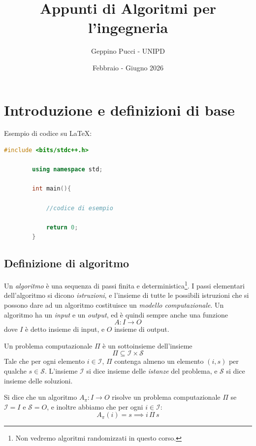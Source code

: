 \documentclass[11pt]{scrartcl}
\begin{document}
	\title{Appunti di Algoritmi per l'ingegneria}
	\subtitle{Geppino Pucci - UNIPD}
	\date{Febbraio - Giugno 2026}
	
	
	\maketitle
	
	\tableofcontents
	
	\newpage
	
	\section{Introduzione e definizioni di base}
	Esempio di codice su \LaTeX:
	\begin{lstlisting}[language=C++]
		#include <bits/stdc++.h>
		
		using namespace std;
		
		int main(){
			
			//codice di esempio
			
			return 0;
		}
	\end{lstlisting}
	
	\subsection{Definizione di algoritmo}
	
	\begin{definition}[Algoritmo]
		Un \textit{algoritmo} è una sequenza di passi finita e deterministica\footnote{Non vedremo algoritmi randomizzati in questo corso.}. I passi elementari dell'algoritmo si dicono \textit{istruzioni}, e l'insieme di tutte le possibili istruzioni che si possono dare ad un algoritmo costituisce un \textit{modello computazionale}. Un algoritmo ha un \textit{input} e un \textit{output}, ed è quindi sempre anche una funzione
		$$A:I\to O$$
		dove $I$ è detto insieme di input, e $O$ insieme di output.
	\end{definition}
	\begin{definition}
		Un problema computazionale $\Pi$ è un sottoinsieme dell'insieme 
		$$\Pi\subseteq \mathcal{I}\times \mathcal{S}$$
		Tale che per ogni elemento $i\in\mathcal{I}$, $\Pi$ contenga almeno un elemento $(i,s)$ per qualche $s\in\mathcal{S}$. L'insieme $\mathcal{I}$ si dice insieme delle \textit{istanze} del problema, e $\mathcal{S}$ si dice insieme delle soluzioni. 
	\end{definition}
	\begin{definition}
		Si dice che un algoritmo $A_\pi:I\to O$ risolve un problema computazionale $\Pi$ se 
		$\mathcal{I}=I$ e $\mathcal{S}=O$, e inoltre abbiamo che per ogni $i\in\mathcal{I}$:
		$$A_\pi(i)=s \implies i\,\Pi\, s$$
	\end{definition}
	
\end{document}
